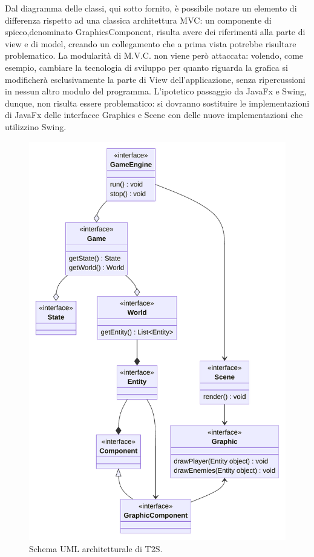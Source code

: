 \documentclass[a4paper,12pt]{report}
\begin{document}
Dal diagramma delle classi, qui sotto fornito, è possibile notare un elemento di differenza rispetto ad una classica architettura MVC: un componente di spicco,denominato GraphicsComponent, risulta avere dei riferimenti alla parte di view e di model, creando un collegamento che a prima vista potrebbe risultare problematico.
%
La modularità di M.V.C. non viene però attaccata: volendo, come esempio, cambiare la tecnologia di sviluppo per quanto riguarda la grafica si modificherà esclusivamente la parte di View dell'applicazione, senza ripercussioni in nessun altro modulo del programma.
%
L’ipotetico passaggio da JavaFx e Swing, dunque, non risulta essere problematico: 
%
si dovranno sostituire le implementazioni di JavaFx delle interfacce Graphics e Scene con delle nuove implementazioni che utilizzino Swing.

\begin{figure}[H]
\centering{}
\includegraphics[width=1\textwidth]{img/SoftwareArchitectureUML.pdf}
\caption{Schema UML architetturale di T2S.}
\label{img:analysis}
\end{figure}
\end{document}
